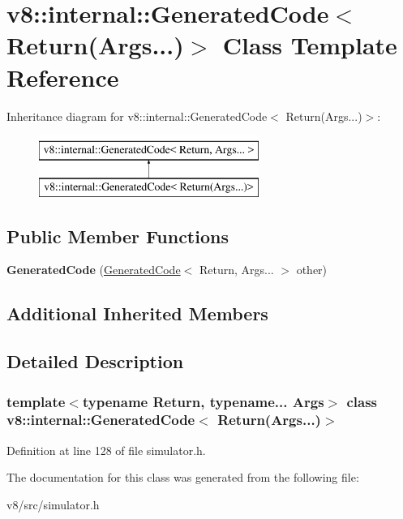 \hypertarget{classv8_1_1internal_1_1GeneratedCode_3_01Return_07Args_8_8_8_08_4}{}\section{v8\+:\+:internal\+:\+:Generated\+Code$<$ Return(Args...)$>$ Class Template Reference}
\label{classv8_1_1internal_1_1GeneratedCode_3_01Return_07Args_8_8_8_08_4}
Inheritance diagram for v8\+:\+:internal\+:\+:Generated\+Code$<$ Return(Args...)$>$\+:\begin{figure}[H]
\begin{center}
\leavevmode
\includegraphics[height=2.000000cm]{classv8_1_1internal_1_1GeneratedCode_3_01Return_07Args_8_8_8_08_4}
\end{center}
\end{figure}
\subsection*{Public Member Functions}
\begin{DoxyCompactItemize}
\item 
\mbox{\label{classv8_1_1internal_1_1GeneratedCode_3_01Return_07Args_8_8_8_08_4_a98e6670e3edd85ec94041aafb47a8d60}} 
{\bfseries Generated\+Code} (\mbox{\hyperlink{classv8_1_1internal_1_1GeneratedCode}{Generated\+Code}}$<$ Return, Args... $>$ other)
\end{DoxyCompactItemize}
\subsection*{Additional Inherited Members}


\subsection{Detailed Description}
\subsubsection*{template$<$typename Return, typename... Args$>$\newline
class v8\+::internal\+::\+Generated\+Code$<$ Return(\+Args...)$>$}



Definition at line 128 of file simulator.\+h.



The documentation for this class was generated from the following file\+:\begin{DoxyCompactItemize}
\item 
v8/src/simulator.\+h\end{DoxyCompactItemize}

